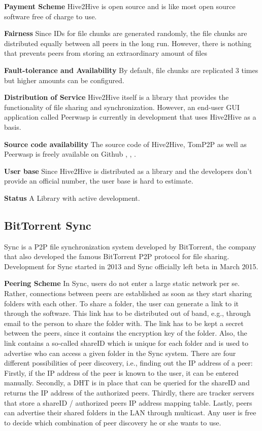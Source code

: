 \textbf{Payment Scheme}
Hive2Hive is open source and is like most open source software free of charge to use.

\textbf{Fairness}
Since IDs for file chunks are generated randomly, the file chunks are distributed equally between all peers in the long run. However, there is nothing that prevents peers from storing an extraordinary amount of files

\textbf{Fault-tolerance and Availability}
By default, file chunks are replicated 3 times but higher amounts can be configured.

\textbf{Distribution of Service}
Hive2Hive itself is a library that provides the functionality of file sharing and synchronization. However, an end-user GUI application called Peerwasp \cite{peerwasp} is currently in development that uses Hive2Hive as a basis.

\textbf{Source code availability}
The source code of Hive2Hive, TomP2P as well as Peerwasp is freely available on Github \cite{hive2hive:github}, \cite{tomp2p:github}, \cite{peerwasp:github}. 

\textbf{User base}
Since Hive2Hive is distributed as a library and the developers don't provide an official number, the user base is hard to estimate.

\textbf{Status}
A Library with active development.

\subsection{BitTorrent Sync}
\label{subsec:bittorrent}
Sync is a P2P file synchronization system developed by BitTorrent, the company that also developed the famous BitTorrent P2P protocol for file sharing. Development for Sync started in 2013 and Sync officially left beta in March 2015.

\textbf{Peering Scheme}
In Sync, users do not enter a large static network per se. Rather, connections between peers are established as soon as they start sharing folders with each other. To share a folder, the user can generate a link to it through the software. This link has to be distributed out of band, e.g., through email to the person to share the folder with. The link has to be kept a secret between the peers, since it contains the encryption key of the folder. Also, the link contains a so-called shareID which is unique for each folder and is used to advertise who can access a given folder in the Sync system. There are four different possibilities of peer discovery, i.e., finding out the IP address of a peer: Firstly, if the IP address of the peer is known to the user, it can be entered manually. Secondly, a DHT is in place that can be queried for the shareID and returns the IP address of the authorized peers. Thirdly, there are tracker servers that store a shareID / authorized peers IP address mapping table. Lastly, peers can advertise their shared folders in the LAN through multicast. Any user is free to decide which combination of peer discovery he or she wants to use.

